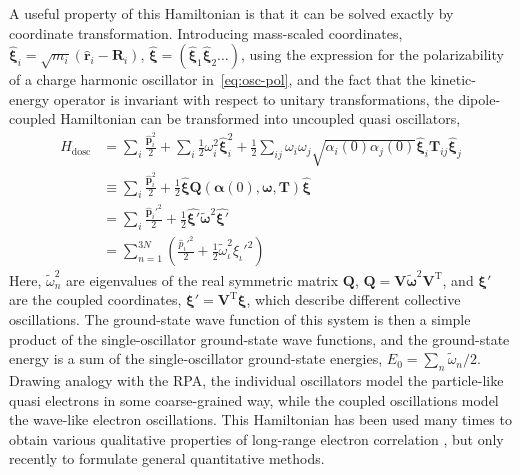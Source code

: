 A useful property of this Hamiltonian is that it can be solved exactly by coordinate transformation.
Introducing mass-scaled coordinates, $\hat{\boldsymbol\xi}_i=\sqrt{m_i}(\mathbf{\hat r}_i-\mathbf R_i)$, $\hat{\boldsymbol\xi}=(\hat{\boldsymbol\xi}_1\hat{\boldsymbol\xi}_2\ldots)$, using the expression for the polarizability of a charge harmonic oscillator in~\eqref{eq:osc-pol}, and the fact that the kinetic-energy operator is invariant with respect to unitary transformations, the dipole-coupled Hamiltonian can be transformed into uncoupled quasi oscillators,
\begin{equation}
\begin{aligned}
  \hat H_\text{dosc}&=\sum_i\frac{\mathbf{\hat p}_i^2}2+\sum_i\frac12\omega_i^2\hat{\boldsymbol\xi}_i^2+\frac12\sum_{ij}\omega_i\omega_j\sqrt{\alpha_i(0)\alpha_j(0)}\hat{\boldsymbol\xi}_i\mathbf T_{ij}\hat{\boldsymbol\xi}_j \\
  &\equiv\sum_i\frac{\mathbf{\hat p}_i^2}2+\frac12\hat{\boldsymbol\xi}\mathbf Q(\boldsymbol\alpha(0),\boldsymbol\omega,\mathbf T)\hat{\boldsymbol\xi} \\
  &=\sum_i\frac{\mathbf{\hat p}_i'^2}2+\frac12\hat{\boldsymbol\xi'}\tilde{\boldsymbol\omega}^2\hat{\boldsymbol\xi'} \\
  &=\sum_{n=1}^{3N}\left(\frac{\hat p_\iota'^2}2+\frac12\tilde\omega_\iota^2\hat\xi_\iota'^2\right)
\end{aligned}
\label{eq:dosc-hamil}
\end{equation}
Here, $\tilde\omega_n^2$ are eigenvalues of the real symmetric matrix $\mathbf Q$, $\mathbf Q=\mathbf V\tilde{\boldsymbol\omega}^2\mathbf V^\mathrm T$, and $\boldsymbol\xi'$ are the coupled coordinates, $\boldsymbol\xi'=\mathbf V^\mathrm T\boldsymbol\xi$, which describe different collective oscillations.
The ground-state wave function of this system is then a simple product of the single-oscillator ground-state wave functions, and the ground-state energy is a sum of the single-oscillator ground-state energies, $E_0=\sum_n\tilde\omega_n/2$.
Drawing analogy with the RPA, the individual oscillators model the particle-like quasi electrons in some coarse-grained way, while the coupled oscillations model the wave-like electron oscillations.
This Hamiltonian has been used many times to obtain various qualitative properties of long-range electron correlation \citep{BadeJCP57,BadeJCP57a,MahanJCP65,LucasP67,RenneCPL67,DonchevJCP06}, but only recently to formulate general quantitative methods.

